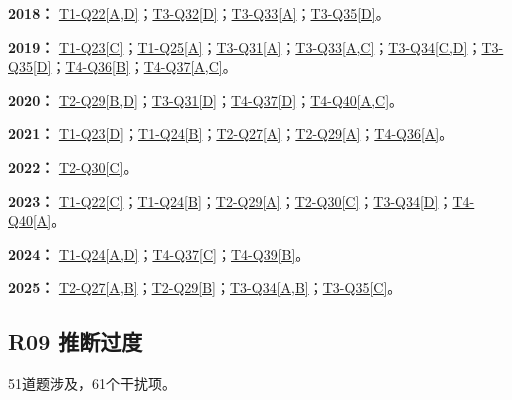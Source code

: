 \documentclass[11pt,a4paper]{article}
\begin{document}
\noindent\textbf{2018：} \hyperref[idx-2018-T1-Q22]{T1-Q22[A,D]}；\hyperref[idx-2018-T3-Q32]{T3-Q32[D]}；\hyperref[idx-2018-T3-Q33]{T3-Q33[A]}；\hyperref[idx-2018-T3-Q35]{T3-Q35[D]}。\par\smallskip
\noindent\textbf{2019：} \hyperref[idx-2019-T1-Q23]{T1-Q23[C]}；\hyperref[idx-2019-T1-Q25]{T1-Q25[A]}；\hyperref[idx-2019-T3-Q31]{T3-Q31[A]}；\hyperref[idx-2019-T3-Q33]{T3-Q33[A,C]}；\hyperref[idx-2019-T3-Q34]{T3-Q34[C,D]}；\hyperref[idx-2019-T3-Q35]{T3-Q35[D]}；\hyperref[idx-2019-T4-Q36]{T4-Q36[B]}；\hyperref[idx-2019-T4-Q37]{T4-Q37[A,C]}。\par\smallskip
\noindent\textbf{2020：} \hyperref[idx-2020-T2-Q29]{T2-Q29[B,D]}；\hyperref[idx-2020-T3-Q31]{T3-Q31[D]}；\hyperref[idx-2020-T4-Q37]{T4-Q37[D]}；\hyperref[idx-2020-T4-Q40]{T4-Q40[A,C]}。\par\smallskip
\noindent\textbf{2021：} \hyperref[idx-2021-T1-Q23]{T1-Q23[D]}；\hyperref[idx-2021-T1-Q24]{T1-Q24[B]}；\hyperref[idx-2021-T2-Q27]{T2-Q27[A]}；\hyperref[idx-2021-T2-Q29]{T2-Q29[A]}；\hyperref[idx-2021-T4-Q36]{T4-Q36[A]}。\par\smallskip
\noindent\textbf{2022：} \hyperref[idx-2022-T2-Q30]{T2-Q30[C]}。\par\smallskip
\noindent\textbf{2023：} \hyperref[idx-2023-T1-Q22]{T1-Q22[C]}；\hyperref[idx-2023-T1-Q24]{T1-Q24[B]}；\hyperref[idx-2023-T2-Q29]{T2-Q29[A]}；\hyperref[idx-2023-T2-Q30]{T2-Q30[C]}；\hyperref[idx-2023-T3-Q34]{T3-Q34[D]}；\hyperref[idx-2023-T4-Q40]{T4-Q40[A]}。\par\smallskip
\noindent\textbf{2024：} \hyperref[idx-2024-T1-Q24]{T1-Q24[A,D]}；\hyperref[idx-2024-T4-Q37]{T4-Q37[C]}；\hyperref[idx-2024-T4-Q39]{T4-Q39[B]}。\par\smallskip
\noindent\textbf{2025：} \hyperref[idx-2025-T2-Q27]{T2-Q27[A,B]}；\hyperref[idx-2025-T2-Q29]{T2-Q29[B]}；\hyperref[idx-2025-T3-Q34]{T3-Q34[A,B]}；\hyperref[idx-2025-T3-Q35]{T3-Q35[C]}。\par\smallskip
{}
\subsection{R09 推断过度}\label{class-R09}
51道题涉及，61个干扰项。
\end{document}
